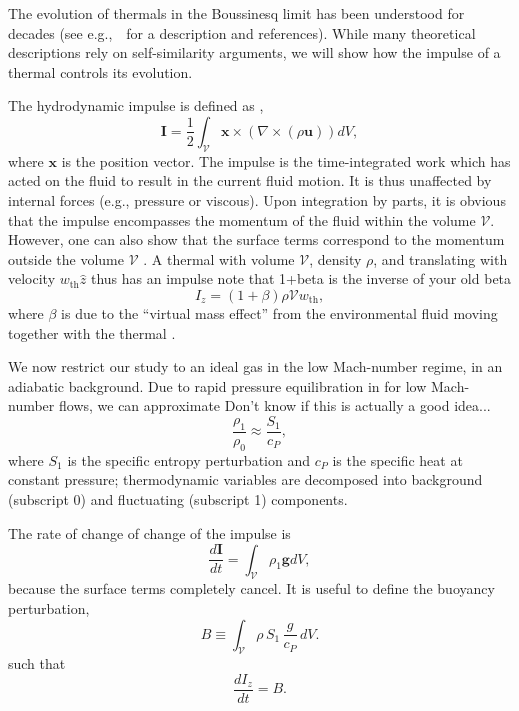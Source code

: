 \documentclass[twocolumn, amsmath, amsfonts, amssymb, trackchanges]{aastex62}
\newcommand{\grad}{\ensuremath{\nabla}}
\newcommand{\dl}[1]{{\color{blue} #1}}
\newcommand{\LJ}{\citetalias{lecoanet&jeevanjee2018}}
\begin{document}
The evolution of thermals in the Boussinesq limit has been understood for decades (see e.g.,~\LJ\, for a description and references).
While many theoretical descriptions rely on self-similarity arguments, we will show how the impulse of a thermal controls its evolution.

The hydrodynamic impulse is defined as \citep{shivamoggi2010},
\begin{equation}
\bm{I} = \frac{1}{2}\int_{\mathcal{V}} \bm{x}\times(\grad\times(\rho\bm{u}))dV,
\end{equation}
where $\bm{x}$ is the position vector. 
The impulse is the time-integrated work which has acted on the fluid to result in the current fluid motion.
It is thus unaffected by internal forces (e.g., pressure or viscous).
Upon integration by parts, it is obvious that the impulse encompasses the momentum of the fluid within the volume $\mathcal{V}$.
However, one can also show that the surface terms correspond to the momentum outside the volume $\mathcal{V}$ \citep[e.g.][]{Akhmetov2009}.
A thermal with volume $\mathcal{V}$, density $\rho$, and translating with velocity $w_{\text{th}} \hat{z}$ thus has an impulse \dl{note that 1+beta is the inverse of your old beta}
\begin{equation}\label{eqn:momentum}
I_z = (1+\beta) \rho \mathcal{V} w_{\text{th}},
\end{equation}
where $\beta$ is due to the ``virtual mass effect'' from the environmental fluid moving together with the thermal \citep{tarshish&all2018}.

We now restrict our study to an ideal gas in the low Mach-number regime, in an adiabatic background.
Due to rapid pressure equilibration in for low Mach-number flows, we can approximate \dl{Don't know if this is actually a good idea...}
\begin{equation*}
\frac{\rho_1}{\rho_0} \approx \frac{S_1}{c_P},
\end{equation*}
where $S_1$ is the specific entropy perturbation and $c_P$ is the specific heat at constant pressure; thermodynamic variables are decomposed into background (subscript 0) and fluctuating (subscript 1) components.

The rate of change of change of the impulse is
\begin{equation*}
\frac{d\bm{I}}{d t} = \int_\mathcal{V} \rho_1 \bm{g} dV,
\end{equation*}
because the surface terms completely cancel.
It is useful to define the buoyancy perturbation,
\begin{equation}
B \equiv \int_{\mathcal{V}} \rho\, S_1\, \frac{g}{c_P}\, dV.
\label{eqn:tot_buoyancy}
\end{equation}
such that
\begin{equation}
\frac{d I_z}{d t} = B.
\label{eqn:change_in_impulse}
\end{equation}
\end{document}
